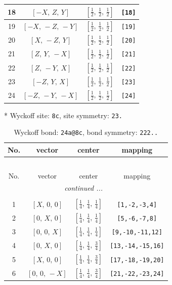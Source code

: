 \documentclass[fleqn,8pt]{jsarticle}
\begin{document}
\begin{longtable}{cccc}
18 & $\left[ - X,\, Z,\, Y \right]$ & $\left[ \frac{1}{2},\, \frac{1}{2},\, \frac{1}{2} \right]$ & {\tt [18]} \\ \hline
19 & $\left[ - X,\, - Z,\, - Y \right]$ & $\left[ \frac{1}{2},\, \frac{1}{2},\, \frac{1}{2} \right]$ & {\tt [19]} \\ \hline
20 & $\left[ X,\, - Z,\, Y \right]$ & $\left[ \frac{1}{2},\, \frac{1}{2},\, \frac{1}{2} \right]$ & {\tt [20]} \\ \hline
21 & $\left[ Z,\, Y,\, - X \right]$ & $\left[ \frac{1}{2},\, \frac{1}{2},\, \frac{1}{2} \right]$ & {\tt [21]} \\ \hline
22 & $\left[ Z,\, - Y,\, X \right]$ & $\left[ \frac{1}{2},\, \frac{1}{2},\, \frac{1}{2} \right]$ & {\tt [22]} \\ \hline
23 & $\left[ - Z,\, Y,\, X \right]$ & $\left[ \frac{1}{2},\, \frac{1}{2},\, \frac{1}{2} \right]$ & {\tt [23]} \\ \hline
24 & $\left[ - Z,\, - Y,\, - X \right]$ & $\left[ \frac{1}{2},\, \frac{1}{2},\, \frac{1}{2} \right]$ & {\tt [24]} \\
\end{longtable}
* Wyckoff site: {\tt 8c}, site symmetry: {\tt 23.}
\renewcommand{\arraystretch}{1.2}
\begin{longtable}{cccc}
\caption{Wyckoff bond: {\tt 24a@8c}, bond symmetry: {\tt 222..}}
 \\
 \hline \hline
No. & vector & center & mapping \\ \hline \endfirsthead

\multicolumn{3}{l}{\tablename\ \thetable{}} \\
 \hline \hline
No. & vector & center & mapping \\ \hline \endhead

 \hline \hline
\multicolumn{3}{r}{\footnotesize\it continued ...} \\ \endfoot

 \hline \hline
\multicolumn{3}{r}{} \\ \endlastfoot

1 & $\left[ X,\, 0,\, 0 \right]$ & $\left[ \frac{1}{4},\, \frac{1}{4},\, \frac{1}{4} \right]$ & {\tt [1,-2,-3,4]} \\ \hline
2 & $\left[ 0,\, X,\, 0 \right]$ & $\left[ \frac{1}{4},\, \frac{1}{4},\, \frac{1}{4} \right]$ & {\tt [5,-6,-7,8]} \\ \hline
3 & $\left[ 0,\, 0,\, X \right]$ & $\left[ \frac{1}{4},\, \frac{1}{4},\, \frac{1}{4} \right]$ & {\tt [9,-10,-11,12]} \\ \hline
4 & $\left[ 0,\, X,\, 0 \right]$ & $\left[ \frac{1}{4},\, \frac{1}{4},\, \frac{3}{4} \right]$ & {\tt [13,-14,-15,16]} \\ \hline
5 & $\left[ X,\, 0,\, 0 \right]$ & $\left[ \frac{1}{4},\, \frac{1}{4},\, \frac{3}{4} \right]$ & {\tt [17,-18,-19,20]} \\ \hline
6 & $\left[ 0,\, 0,\, - X \right]$ & $\left[ \frac{1}{4},\, \frac{1}{4},\, \frac{3}{4} \right]$ & {\tt [21,-22,-23,24]} \\
\end{longtable}
\end{document}
